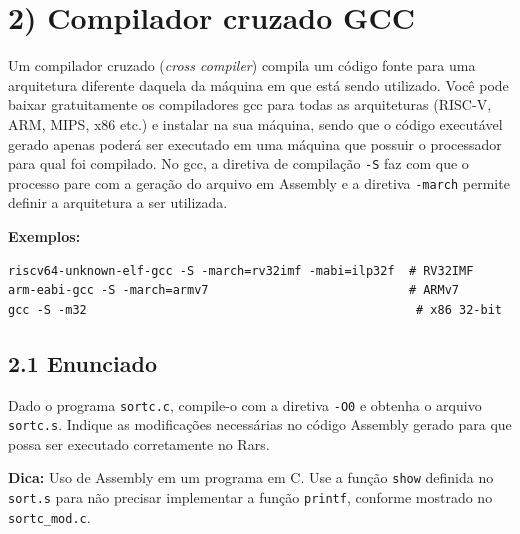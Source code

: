 \documentclass[12pt,a4paper]{article}
\begin{document}
\section*{2) Compilador cruzado GCC}

Um compilador cruzado (\textit{cross compiler}) compila um código fonte para uma arquitetura diferente daquela da máquina em que está sendo utilizado. Você pode baixar gratuitamente os compiladores gcc para todas as arquiteturas (RISC-V, ARM, MIPS, x86 etc.) e instalar na sua máquina, sendo que o código executável gerado apenas poderá ser executado em uma máquina que possuir o processador para qual foi compilado. No gcc, a diretiva de compilação \texttt{-S} faz com que o processo pare com a geração do arquivo em Assembly e a diretiva \texttt{-march} permite definir a arquitetura a ser utilizada.

\textbf{Exemplos:}
\begin{verbatim}
riscv64-unknown-elf-gcc -S -march=rv32imf -mabi=ilp32f  # RV32IMF
arm-eabi-gcc -S -march=armv7                            # ARMv7
gcc -S -m32                                              # x86 32-bit
\end{verbatim}

\subsection*{2.1 Enunciado}

Dado o programa \texttt{sortc.c}, compile-o com a diretiva \texttt{-O0} e obtenha o arquivo \texttt{sortc.s}. Indique as modificações necessárias no código Assembly gerado para que possa ser executado corretamente no Rars. 

\textbf{Dica:} Uso de Assembly em um programa em C. Use a função \texttt{show} definida no \texttt{sort.s} para não precisar implementar a função \texttt{printf}, conforme mostrado no \texttt{sortc\_mod.c}.
\end{document}
